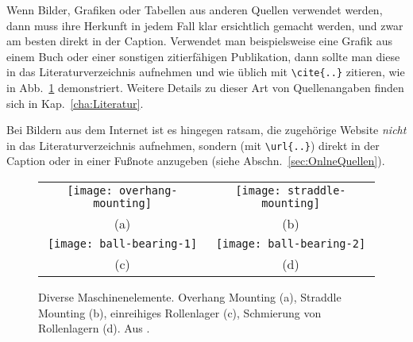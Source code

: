 Wenn Bilder, Grafiken oder Tabellen aus anderen Quellen verwendet werden, dann muss ihre Herkunft in jedem Fall klar ersichtlich gemacht werden, und zwar am besten direkt in der Caption.
Verwendet man beispielsweise eine Grafik aus einem Buch oder einer sonstigen zitierfähigen Publikation, dann sollte man diese in das Literaturverzeichnis aufnehmen und wie üblich mit
\verb!\cite{..}! zitieren, wie in Abb.\ \ref{fig:Bearings} demonstriert. Weitere Details zu dieser Art von Quellenangaben finden sich in Kap.\ \ref{cha:Literatur}.

Bei Bildern aus dem Internet ist es hingegen ratsam, die zugehörige Website \emph{nicht} in das Literaturverzeichnis aufnehmen, sondern (mit \verb!\url{..}!) direkt in der Caption oder in einer Fußnote anzugeben (siehe Abschn.\ \ref{sec:OnlneQuellen}). 

\begin{comment} %
Allerdings ist in \latex\ die Verwendung von Fußnoten innerhalb eines Float-Objekts praktisch unmöglich.
Alternativ kann man die zugehörige Website mit \verb!\url{}! direkt in der Caption anzugeben, aber auch das geht nicht direkt, sondern nur mit einem kleinen Trick: mit \verb!\urldef! wird die Website zunächst außerhalb der Caption definiert und dann innerhalb der Caption verwendet.
Diese Variante wird in Abb.\ \ref{fig:photoshop-set-resolution} verwendet;
hier ist der zugehörige Quellcode:
%
\begin{LaTeXCode}
\begin{figure}
\urldef\MyUrl\url{http://www.gettyimages.com}    %
...
\caption{Einstellen der Bildauflösung ... (Bildquelle: \MyUrl)} /+\label{lin:MyUrl2}+/
\end{figure}
\end{LaTeXCode}
%
Hier wird das frei gewählte URL-Kommando \verb!\MyUrl! außerhalb der Caption (Zeile \ref{lin:MyUrl1}) definiert und innerhalb der Caption (Zeile \ref{lin:MyUrl2}) verwendet.
\verb!\MyUrl! kann übrigens nachfolgend auch für beliebige andere URLs verwendet werden.
\end{comment}


\begin{figure}
\centering\small
\begin{tabular}{cc}
  \texttt{[image: overhang-mounting]} &
  \texttt{[image: straddle-mounting]} \\
  (a) & (b)
\\[4pt]	%
  \texttt{[image: ball-bearing-1]} &
  \texttt{[image: ball-bearing-2]} \\
  (c) & (d)
\end{tabular}
%
\caption{Diverse Maschinenelemente.
Overhang Mounting (a), Straddle Mounting (b),
einreihiges Rollenlager (c), Schmierung von Rollenlagern (d).
Aus \cite{Faires34}.
}
\label{fig:Bearings}
\end{figure}



